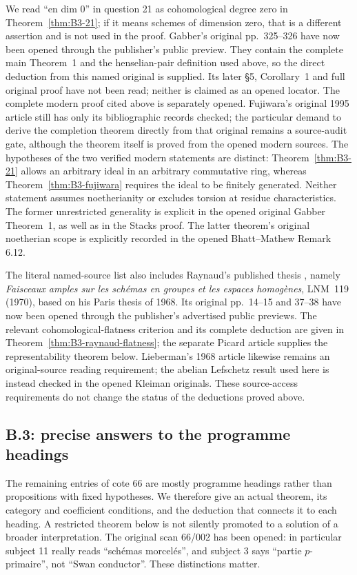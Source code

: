 We read ``en dim 0'' in question 21 as cohomological degree zero in
Theorem~\ref{thm:B3-21}; if it means schemes of dimension zero, that is a
different assertion and is not used in the proof. Gabber's original
pp.~325--326 have now been opened through the publisher's public
preview. They contain the complete main Theorem~1 and the henselian-pair
definition used above, so the direct deduction from this named original
is supplied. Its later \S5, Corollary~1 and full original proof have
not been read; neither is claimed as an opened locator. The complete
modern proof cited above is separately opened. Fujiwara's original
1995 article still has only its bibliographic records checked; the
particular demand to derive the completion theorem directly from that
original remains a source-audit gate, although the theorem itself is
proved from the opened modern sources.
The hypotheses of the two verified modern statements are distinct:
Theorem~\ref{thm:B3-21} allows an arbitrary ideal in an arbitrary
commutative ring, whereas Theorem~\ref{thm:B3-fujiwara} requires the
ideal to be finitely generated. Neither statement assumes
noetherianity or excludes torsion at residue characteristics.
The former unrestricted generality is explicit in the opened original
Gabber Theorem~1, as well as in the Stacks proof. The latter theorem's
original noetherian scope is explicitly recorded in the opened
Bhatt--Mathew Remark 6.12.

The literal named-source list also includes Raynaud's published thesis
\cite{BRaynaudThesis1970}, namely \emph{Faisceaux amples sur les
sch\'emas en groupes et les espaces homog\`enes}, LNM~119 (1970),
based on his Paris thesis of 1968. Its original pp.~14--15 and 37--38
have now been opened through the publisher's advertised public previews.
The relevant cohomological-flatness criterion and its complete deduction
are given in Theorem~\ref{thm:B3-raynaud-flatness}; the separate Picard
article supplies the representability theorem below.
Lieberman's 1968 article likewise remains an original-source reading
requirement; the abelian Lefschetz result used here is instead checked
in the opened Kleiman originals. These source-access requirements do
not change the status of the deductions proved above.

\subsection{B.3: precise answers to the programme headings}

The remaining entries of cote 66 are mostly programme headings rather
than propositions with fixed hypotheses. We therefore give an actual
theorem, its category and coefficient conditions, and the deduction
that connects it to each heading. A restricted theorem below is not
silently promoted to a solution of a broader interpretation. The
original scan 66/002 has been opened: in particular subject 11 really
reads ``sch\'emas morcel\'es'', and subject 3 says ``partie
$p$-primaire'', not ``Swan conductor''. These distinctions matter.

